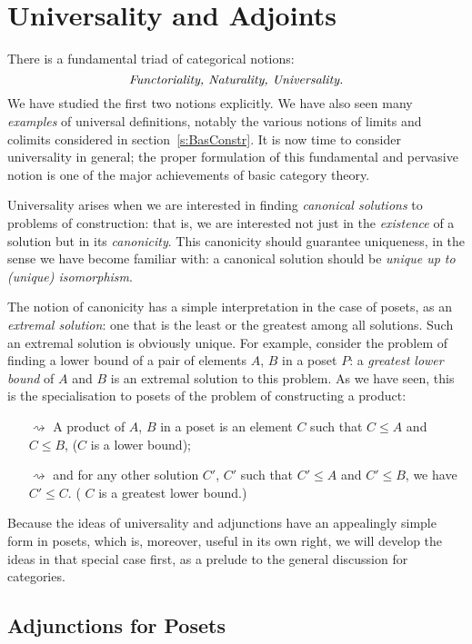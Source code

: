 \documentclass[12pt]{article}
\begin{document}
\section{Universality and Adjoints}\label{s:Univ}

There is a fundamental triad of categorical notions:
\[ \text{\emph{Functoriality, Naturality, Universality.}} \]
%
We have studied the first two notions explicitly. We have also seen many \emph{examples} of universal definitions, notably the various notions of limits and colimits considered in section~\ref{s:BasConstr}. It is now time to consider universality in general; the proper formulation of this fundamental and pervasive notion is one of the major achievements of basic category theory.

Universality arises when we are interested in finding \emph{canonical solutions} to problems of construction: that is, we are interested not just in the \emph{existence} of a solution but in its \emph{canonicity}. This canonicity should guarantee uniqueness, in the sense we have become familiar with: a canonical solution should be \emph{unique up to (unique) isomorphism}.

The notion of canonicity has a simple interpretation in the case of posets, as an \emph{extremal solution}: one that is the least or the greatest among all solutions. Such an extremal solution is obviously unique.
For example, consider the problem of finding a lower bound of a pair of elements $A$, $B$ in a poset $P$: a \emph{greatest lower bound} of $A$ and $B$ is an extremal solution to this problem. As we have seen, this is the specialisation to posets of the problem of constructing a product:
\begin{itemize}
\item[$\rightsquigarrow$] A product of $A$, $B$ in a poset is an element $C$ such that $C \leq A$ and $C\leq B$, ($C$ is a lower bound);
\item[$\rightsquigarrow$] and for any other solution $C'$, \ie $C'$ such that $C'\leq A$ and $C'\leq B$, we have $C'\leq C$.
    ( $C$ is a greatest lower bound.)
\end{itemize}
Because the ideas of universality and adjunctions have an appealingly simple form in posets, which is, moreover,  useful in its own right, we will develop the ideas in that special case first, as a prelude to the general discussion for categories.

\subsection{Adjunctions for Posets}
\end{document}
